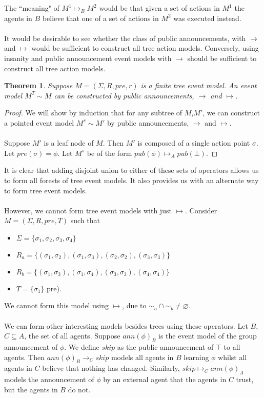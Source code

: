 \documentclass[12pt, a4paper, titlepage]{scrartcl}
\newtheorem{thm}{Theorem}[section]
\numberwithin{equation}{section}
\begin{document}
The ``meaning" of $M^1 \mapsto_B M^2$ would be that given a set of actions in
$M^1$ the agents in $B$ believe that one of a set of actions in $M^2$ was
executed instead.\\
\\
It would be desirable to see whether the class of public announcements, with
$\to$ and $\mapsto$ would be sufficient to construct all tree action
models.
Conversely, using insanity and public announcement event models with $\to$ should be sufficient to construct
all tree action models.
\begin{thm}
Suppose $M = (\Sigma, R, pre, r)$ is a finite tree event model.
An event model $M^T \sim M$ can be constructed by public announcements, $\to$ and
$\mapsto$.
\end{thm}
\begin{proof}
We will show by induction that for any subtree of $M$,$M'$, we can construct a pointed event model
$M^s \sim M'$ by public announcements, $\to$ and $\mapsto$.\\
\\
Suppose $M'$ is a leaf node of $M$.
Then $M'$ is composed of a single action point $\sigma$.
Let $pre(\sigma) = \phi$.
Let $M^s$ be of the form $pub(\phi) \mapsto_A pub(\bot)$.
\end{proof}
It is clear that adding disjoint union to either of these sets of operators
allows us to form all forests of tree event models.
It also provides us with an alternate way to form tree event models.\\
\\
However, we cannot form tree event models with just $\mapsto$.
Consider $M = (\Sigma, R, pre, T)$ such that
\begin{itemize}
	\item $\Sigma = \{\sigma_1, \sigma_2, \sigma_3, \sigma_4\}$
	\item $R_a =
\{(\sigma_1,\sigma_2),(\sigma_1,\sigma_3),(\sigma_2,\sigma_2),(\sigma_3,\sigma_3)\}$
	\item $R_b = \{(\sigma_1,\sigma_3),(\sigma_1,\sigma_4),(\sigma_3,\sigma_3),(\sigma_4,\sigma_4)\}$
	\item $T = \{ \sigma_1 \}$
pre).
\end{itemize}
We cannot form this model using $ \mapsto $, due to $\sim_a \cap \sim_b \neq
\varnothing$.\\
\\
We can form other interesting models besides trees using these operators.
Let $B$, $C \subseteq A$, the set of all agents.
Suppose $ann(\phi)_B$ is the event model of the group announcement of $\phi$.
We define $skip$ as the public announcement of $\top$ to all agents.
Then $ann(\phi)_B \to_C skip$ models all agents in $B$ learning $\phi$ whilst all agents in $C$
believe that nothing has changed.
Similarly, $skip \mapsto_C ann(\phi)_A$ models the announcement of $\phi$ by an external agent that
the agents in $C$ trust, but the agents in $B$ do not.\\
\\
\end{document}
